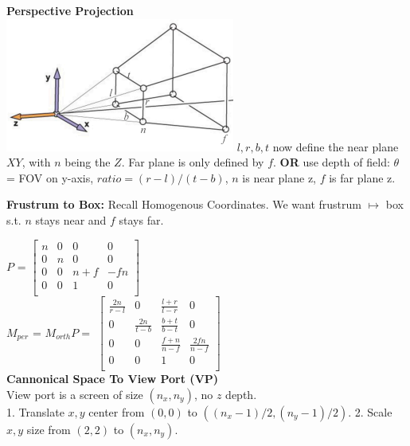 \documentclass[letterpaper, 8pt]{extarticle}
\begin{document}
\begin{multicols*}{4}
\textbf{Perspective Projection}\\
\includegraphics[width=\linewidth]{cam-persp.png} 
$l,r,b,t$ now define the near plane $XY$, with $n$ being the $Z$. Far plane is only defined by $f$. 
\textbf{OR} use depth of field: 
$\theta$ = FOV on y-axis, $ratio = (r-l)/(t-b)$, $n$ is near plane z, $f$ is far plane z.

\textbf{Frustrum to Box:}
Recall Homogenous Coordinates. We want frustrum $\mapsto$ box s.t. $n$ stays near and $f$ stays far.

$P$ = 
\(
\begin{bmatrix}
    n & 0 & 0 & 0 \\
    0 & n & 0 & 0 \\
    0 & 0 & n+f & -fn \\
    0 & 0 & 1 & 0 \\
\end{bmatrix}
\)\\
$M_{per}$ = $M_{orth}P =$
\(
\begin{bmatrix}
    \frac{2n}{r-l} & 0 & \frac{l+r}{l-r} & 0 \\
    0 & \frac{2n}{t-b} & \frac{b+t}{b-t} & 0 \\
    0 & 0 & \frac{f+n}{n-f} & \frac{2fn}{n-f} \\
    0 & 0 & 1 & 0 \\
\end{bmatrix}
\)\\

\textbf{Cannonical Space To View Port (VP)}\\

View port is a screen of size $(n_x, n_y)$, no $z$ depth.\\
1. Translate $x,y$ center from $(0,0)$ to $((n_x-1)/2, (n_y-1)/2)$. 
2. Scale $x,y$ size from $(2,2)$ to $(n_x, n_y)$.


\end{multicols*}
\end{document}
